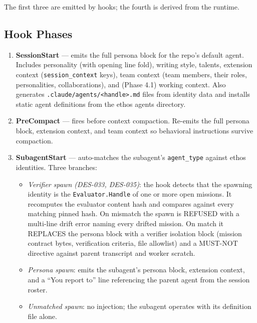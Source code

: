 \documentclass[a4paper,10pt]{article}
\newcommand{\field}[1]{\texttt{#1}}
\newcommand{\fpath}[1]{\texttt{#1}}
\begin{document}
The first three are emitted by hooks; the fourth is derived from
the runtime.

\subsection{Hook Phases}

\begin{enumerate}
  \item \textbf{SessionStart} --- emits the full persona block for
    the repo's default agent.  Includes personality (with opening
    line fold), writing style, talents, extension context
    (\texttt{session\_context} keys), team context (team members,
    their roles, personalities, collaborations), and (Phase 4.1)
    working context.  Also generates
    \fpath{.claude/agents/<handle>.md} files from identity data and
    installs static agent definitions from the ethos agents
    directory.

  \item \textbf{PreCompact} --- fires before context compaction.
    Re-emits the full persona block, extension context, and team
    context so behavioral instructions survive compaction.

  \item \textbf{SubagentStart} --- auto-matches the subagent's
    \field{agent\_type} against ethos identities.  Three branches:
    \begin{itemize}
      \item \emph{Verifier spawn (DES-033, DES-035)}: the hook
        detects that the spawning identity is the
        \field{Evaluator.Handle} of one or more open missions.  It
        recomputes the evaluator content hash and compares against
        every matching pinned hash.  On mismatch the spawn is
        REFUSED with a multi-line drift error naming every drifted
        mission.  On match it REPLACES the persona block with a
        verifier isolation block (mission contract bytes,
        verification criteria, file allowlist) and a MUST-NOT
        directive against parent transcript and worker scratch.
      \item \emph{Persona spawn}: emits the subagent's persona
        block, extension context, and a ``You report to'' line
        referencing the parent agent from the session roster.
      \item \emph{Unmatched spawn}: no injection; the subagent
        operates with its definition file alone.
    \end{itemize}
\end{enumerate}
\end{document}
